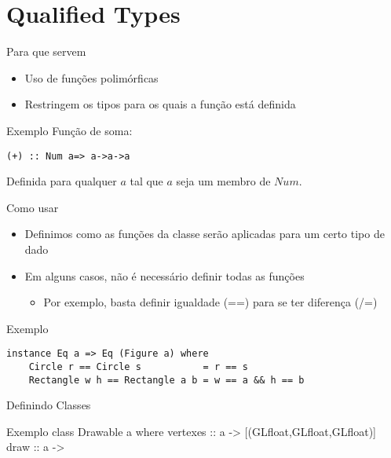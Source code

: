 \documentclass{beamer}
\begin{document}
	\section{Qualified Types}
		\begin{frame}{}
		\end{frame}
		
		\begin{frame}[fragile]{Para que servem}
			\begin{itemize}
			  \item Uso de funções polimórficas
				\item Restringem os tipos para os quais a função está definida
			\end{itemize}
			
			\begin{block}{Exemplo}
			 Função de soma:
			 \begin{lstlisting}
(+) :: Num a=> a->a->a
			 \end{lstlisting}
			 Definida para qualquer $a$ tal que $a$ seja um membro de $Num$.
			\end{block}
		 
		\end{frame}
		
		\begin{frame}[fragile]{Como usar}
		 
		 \begin{itemize}
		  \item Definimos como as funções da classe serão aplicadas para um certo tipo de dado
		  \item Em alguns casos, não é necessário definir todas as funções
		  \begin{itemize}
		   \item Por exemplo, basta definir igualdade (==) para se ter diferença (/=)
		  \end{itemize}

		 \end{itemize}
		 
		 \begin{block}{Exemplo}
		  \begin{lstlisting}
instance Eq a => Eq (Figure a) where
	Circle r == Circle s           = r == s
	Rectangle w h == Rectangle a b = w == a && h == b
		  \end{lstlisting}
		 \end{block}		 
		\end{frame}
		
		\begin{frame}[fragile]{Definindo Classes}
		 
		 \begin{block}{Exemplo}
class Drawable a where
	vertexes :: a -> [(GLfloat,GLfloat,GLfloat)]
	draw :: a ->
		 \end{block}

		\end{frame}
\end{document}
